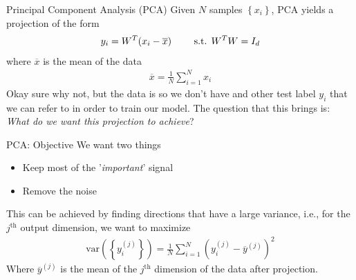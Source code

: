 \begin{parag}{Principal Component Analysis (PCA)}
    Given $N$ samples $\left\{x_i\right\}$, PCA yields a projection of the form 
	\begin{align*} 
		y_i =  W^{T}\left(x_i - \overline{x}\right) \mathspace \mathspace \text{ s.t. } W^{T}W =  I_d
	\end{align*}
	where $\overline{x}$ is the mean of the data 
	\begin{align*} 
		\overline{x} = \frac{1}{N} \sum_{i= 1}^{N}x_i
	\end{align*}
	Okay sure why not, but the data is  so we don't have and other test label $y_i$ that we can refer to in order to train our model. The question that this brings is: \textit{What do we want this projection to achieve}?
\end{parag}

\begin{parag}{PCA: Objective}
	We want two things 
	\begin{itemize}
	    \item Keep most of the '\textit{important}' signal
	    \item Remove the noise
	\end{itemize}
	This can be achieved by finding directions that have a large variance, i.e., for the $j^{\text{th}}$ output dimension, we want to maximize 
	\begin{align*} 
		\text{var}\left(\left\{y_i^{\left(j\right)}\right\}\right) = \frac{1}{N} \sum_{i= 1}^{N}\left(y_i^{\left(j\right)} - \overline{y}^{\left(j\right)}\right)^2
	\end{align*}
	Where $\overline{y}^{\left(j\right)}$ is the mean of the $j^{\text{th}}$ dimension of the data after projection.
\end{parag}


